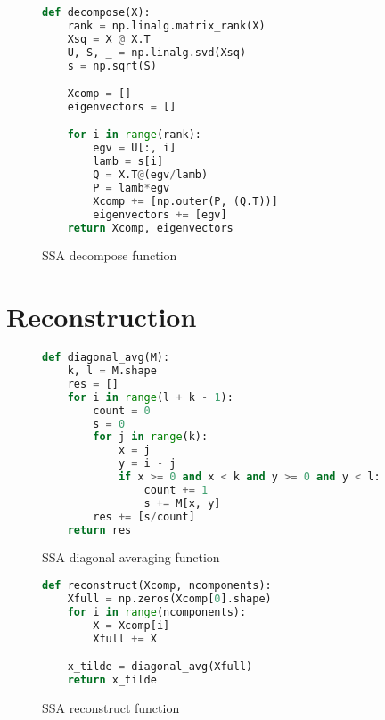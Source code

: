 \begin{figure}
\begin{singlespace}
\begin{lstlisting}[language=Python]
def decompose(X):
    rank = np.linalg.matrix_rank(X)
    Xsq = X @ X.T
    U, S, _ = np.linalg.svd(Xsq)
    s = np.sqrt(S)

    Xcomp = []
    eigenvectors = []

    for i in range(rank):
        egv = U[:, i]
        lamb = s[i]
        Q = X.T@(egv/lamb)
        P = lamb*egv
        Xcomp += [np.outer(P, (Q.T))]
        eigenvectors += [egv]
    return Xcomp, eigenvectors
\end{lstlisting}
\end{singlespace}
\caption{SSA decompose function}    
\label{fig:ssa-decompose}
\end{figure}

\section{Reconstruction}

\begin{figure}
\begin{singlespace}
\begin{lstlisting}[language=Python]
def diagonal_avg(M):
    k, l = M.shape
    res = []
    for i in range(l + k - 1):
        count = 0
        s = 0
        for j in range(k):
            x = j
            y = i - j
            if x >= 0 and x < k and y >= 0 and y < l:
                count += 1
                s += M[x, y]
        res += [s/count]
    return res
\end{lstlisting}
\end{singlespace}
\caption{SSA diagonal averaging function}    
\label{fig:ssa-diag-avg}
\end{figure}

\begin{figure}
\begin{singlespace}
\begin{lstlisting}[language=Python]
def reconstruct(Xcomp, ncomponents):
    Xfull = np.zeros(Xcomp[0].shape)
    for i in range(ncomponents):
        X = Xcomp[i]
        Xfull += X

    x_tilde = diagonal_avg(Xfull)
    return x_tilde
\end{lstlisting}
\end{singlespace}
\caption{SSA reconstruct function}    
\label{fig:ssa-reconstruct}
\end{figure}

